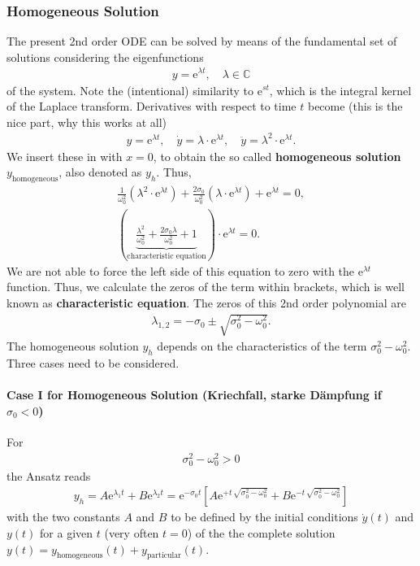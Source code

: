 \documentclass[11pt,a4paper,DIV=12]{scrartcl}
\begin{document}
\subsubsection{Homogeneous Solution}
\label{Sec:FundamentalSet}
The present 2nd order ODE can be solved by means of the
fundamental set of solutions
considering the eigenfunctions
\begin{align}
y = \mathrm{e}^{\lambda t}, \quad \lambda\in\mathbb{C}
\end{align}
of the system. Note the (intentional) similarity to $\mathrm{e}^{s t}$,
which is the integral kernel of the Laplace transform.
%
Derivatives with respect to time $t$ become (this is the nice part, why this
works at all)
\begin{align}
y = \mathrm{e}^{\lambda t},\quad
\dot{y} = \lambda \cdot \mathrm{e}^{\lambda t},\quad
\ddot{y} = \lambda^2 \cdot \mathrm{e}^{\lambda t}.
\end{align}
%
We insert these in  with $x=0$, to obtain the
so called \textbf{homogeneous solution} $y_\text{homogeneous}$, also denoted as
$y_h$.
Thus,
\begin{align}
\frac{1}{\omega_0^2} (\lambda^2 \cdot \mathrm{e}^{\lambda t}) +
\frac{2 \sigma_0}{\omega_0^2} (\lambda \cdot \mathrm{e}^{\lambda t}) +
\mathrm{e}^{\lambda t} = 0,\nonumber\\
\label{eq:CharEq}
\left(\underbrace{\frac{\lambda^2}{\omega_0^2} +
\frac{2 \sigma_0 \lambda}{\omega_0^2} + 1}_\text{characteristic equation}\right)
\cdot \mathrm{e}^{\lambda t} = 0.
\end{align}
%
We are not able to force the left side of this equation to zero with the $\mathrm{e}^{\lambda t}$
function.
Thus, we calculate the zeros of the term within brackets, which is well known as
\textbf{characteristic equation}.
%
The zeros of this 2nd order polynomial are
\begin{align}
\label{eq:lambda12}
\lambda_{1,2} = -\sigma_0 \pm \sqrt{\sigma_0^2 - \omega_0^2}.
\end{align}
%
The homogeneous solution $y_h$ depends on the characteristics
of the term $\sigma_0^2 - \omega_0^2$.
Three cases need to be considered.

\paragraph{Case I for Homogeneous Solution (Kriechfall, starke Dämpfung if $\sigma_0<0$)}
For
\begin{align}
\sigma_0^2 - \omega_0^2 > 0
\end{align}
the Ansatz reads
\begin{align}
y_h=
A \mathrm{e}^{\lambda_1 t} + B \mathrm{e}^{\lambda_2 t}
=
\mathrm{e}^{-\sigma_0 t} [A \mathrm{e}^{+t\,\sqrt{\sigma_0^2 - \omega_0^2}}
+ B \mathrm{e}^{-t\,\sqrt{\sigma_0^2 - \omega_0^2}}]
\end{align}
with the two constants $A$ and $B$ to be defined by the initial conditions
$\dot{y}(t)$ and $y(t)$ for a given $t$ (very often $t=0$)
of the the complete solution
$y(t) = y_\text{homogeneous}(t)+y_\text{particular}(t)$.
\end{document}
